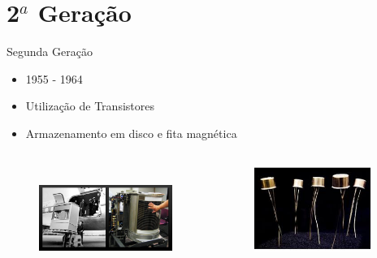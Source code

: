 \documentclass[aspectratio=169,
				xcolor=table]{beamer}
\begin{document}
	\section{2${}^a$ Geração}
	\begin{frame}[t]{Segunda Geração}
		\begin{itemize}
			\item 1955 - 1964 
			\vspace{1em}
			\item Utilização de Transistores 
			\vspace{1em}
			\item Armazenamento em disco e fita magnética
		\end{itemize}

		\vspace{-1em}
		\begin{columns}
			\begin{column}{0.65\textwidth}
				\begin{figure}
					\includegraphics[height=3.5cm, keepaspectratio]{../figs/cap03/geracao22} 			
				\end{figure}
			\end{column}
			\begin{column}{0.35\textwidth}
				\begin{figure}
					\includegraphics[width=0.9\textwidth, keepaspectratio]{../figs/cap03/geracao21} 			
				\end{figure}
			\end{column}
		\end{columns}
		
	\end{frame}
\end{document}
